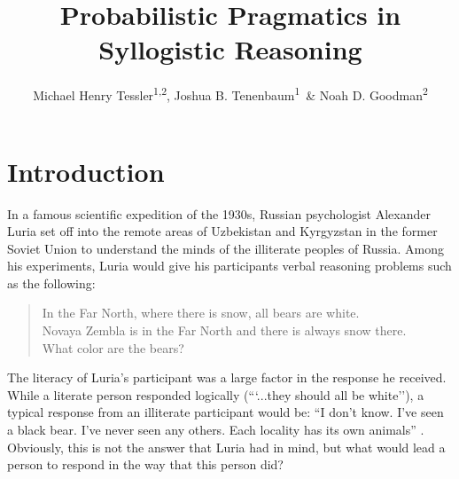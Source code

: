\documentclass[floatsintext, doc]{apa6}
\title{Probabilistic Pragmatics in Syllogistic Reasoning}
\author{Michael Henry Tessler\textsuperscript{1}\textsuperscript{,2}, Joshua B. Tenenbaum\textsuperscript{1}~\& Noah D. Goodman\textsuperscript{2}}
\date{}
\affiliation{
\vspace{0.5cm}
\textsuperscript{1} Department of Brain and Cognitive Sciences, Massachusetts Institute of Technology \\
\textsuperscript{2} Department of Psychology, Stanford University
}
\date{}
\newenvironment{aquote}[1]
{\savebox\mybox{#1}\begin{quote}} {\signed{\usebox\mybox}\end{quote}}
\begin{document}
\maketitle




\section{Introduction}

In a famous scientific expedition of the 1930s, Russian psychologist Alexander Luria set off into the remote areas of Uzbekistan and Kyrgyzstan in the former Soviet Union to understand the minds of the illiterate peoples of Russia. Among his experiments, Luria would give his participants verbal reasoning problems such as the following:

\begin{quote}
In the Far North, where there is snow, all bears are white. \\
Novaya Zembla is in the Far North and there is always snow there. \\
What color are the bears?
\end{quote}

The literacy of Luria's participant was a large factor in the response he received.
While a literate person responded logically (```...they should all be white''), a typical response from an illiterate participant would be: ``I don't know. I've seen a black bear. I've never seen any others. Each locality has its own animals'' \cite{luria1976cognitive}. 
Obviously, this is not the answer that Luria had in mind, but what would lead a person to respond in the way that this person did?

\end{document}
